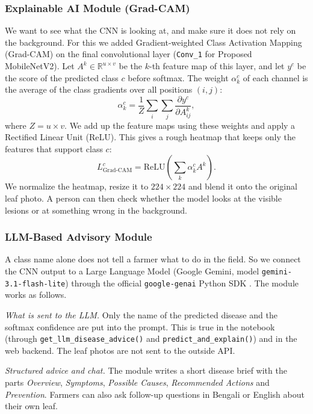 \subsubsection{Explainable AI Module (Grad-CAM)}
We want to see what the CNN is looking at, and make sure it does not rely on the background. For this we added Gradient-weighted Class Activation Mapping (Grad-CAM) \cite{selvaraju2017grad} on the final convolutional layer (\texttt{Conv\_1} for Proposed MobileNetV2). Let $A^k \in \mathbb{R}^{u \times v}$ be the $k$-th feature map of this layer, and let $y^c$ be the score of the predicted class $c$ before softmax. The weight $\alpha_k^c$ of each channel is the average of the class gradients over all positions $(i, j)$:
\begin{equation}
\alpha_k^c = \frac{1}{Z} \sum_{i} \sum_{j} \frac{\partial y^c}{\partial A_{ij}^k},
\end{equation}
where $Z = u \times v$. We add up the feature maps using these weights and apply a Rectified Linear Unit ($\text{ReLU}$). This gives a rough heatmap that keeps only the features that support class $c$:
\begin{equation}
L_{\text{Grad-CAM}}^c = \text{ReLU}\!\left(\sum_{k} \alpha_k^c A^k\right).
\end{equation}
We normalize the heatmap, resize it to $224 \times 224$ and blend it onto the original leaf photo. A person can then check whether the model looks at the visible lesions or at something wrong in the background.

\subsubsection{LLM-Based Advisory Module}
A class name alone does not tell a farmer what to do in the field. So we connect the CNN output to a Large Language Model (Google Gemini, model \texttt{gemini-3.1-flash-lite}) through the official \texttt{google-genai} Python SDK \cite{google2026gemini}. The module works as follows.

\textit{What is sent to the LLM.} Only the name of the predicted disease and the softmax confidence are put into the prompt. This is true in the notebook (through \texttt{get\_llm\_disease\_advice()} and \texttt{predict\_and\_explain()}) and in the web backend. The leaf photos are not sent to the outside API.

\textit{Structured advice and chat.} The module writes a short disease brief with the parts \textit{Overview}, \textit{Symptoms}, \textit{Possible Causes}, \textit{Recommended Actions} and \textit{Prevention}. Farmers can also ask follow-up questions in Bengali or English about their own leaf.

